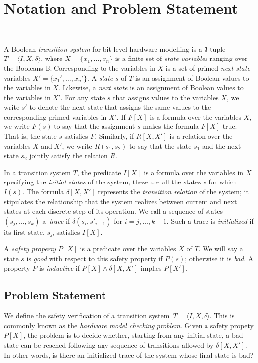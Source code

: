 \section{Notation and Problem Statement}~\label{sec:notation}

A Boolean \textit{transition system} for bit-level hardware
modelling is a 3-tuple $T = \langle I,X,\delta \rangle$, where $X = \{x_1,\dots ,x_n\}$
is a finite set of \textit{state variables} ranging over the Booleans $\mathbb{B}$. 
%
Corresponding to the variables in $X$ is a set of primed \textit{next-state} variables  $X' = \{x_1', \dots, x_n'\}$.
% 
A \textit{state} $s$ of $T$ is an assignment of Boolean values to the variables in $X$. Likewise, a \textit{next state} is an assignment of Boolean values to the variables in $X'$.  For any state $s$ that assigns values to the  variables $X$, we write $s'$ to denote the next state that assigns the same values to the corresponding primed variables in $X'$. If $F[X]$ is a formula over the variables $X$, we write $F(s)$ to say that
the assignment $s$ makes the formula $F[X]$ true. That is, the state $s$ satisfies $F$. Similarly, if $R[X,X']$ is a relation over the variables $X$ and $X'$, we write $R(s_1,s_2)$ to say that the state $s_1$ and the next state $s_2$ jointly satisfy the relation $R$.

In a transition system $T$, the predicate $I[X]$ is a formula over
the variables in $X$ specifying the \textit{initial states} of the system; these are all the states $s$ for which
$I(s)$. The formula $\delta[X,X']$ represents the \textit{transition relation} of the system; it stipulates the relationship that the system 
realizes between current and next states at each discrete step of its operation. 
% 
We call a sequence of states $(s_j,\dots,s_k)$ a~\textit{trace} 
if $\delta(s_i,s'_{i{+}1})$ for $i=j,\dots,k-1$.  Such a trace is 
\textit{initialized} if its first state, $s_j$, satisfies $I[X]$.  
  
A \textit{safety property} $P[X]$ is a predicate over the variables $X$ of $T$.  We will say a state $s$ is \textit{good} with respect to this safety property if 
$P(s)$; otherwise it is \textit{bad}. A property $P$ is \textit{inductive} if $P[X] \wedge \delta[X,X']$ implies $P[X']$.    
%

\subsection{Problem Statement} We define the safety verification of a transition system~$T = \langle I,X,\delta\rangle$.
This is commonly known as the \textit{hardware model checking problem}.  
Given a safety propety $P[X]$, the problem is to decide whether, starting from any initial state, a bad state can be reached following any sequence of transitions allowed by $\delta[X,X']$. In other words, is there an initialized trace of the system whose final state is bad?
%
